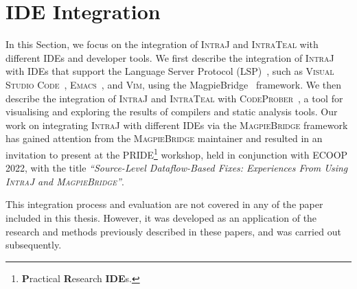 \section{IDE Integration}
\label{sec:IDEIntegration}
In this Section, we focus on the integration of \textsc{IntraJ} and \textsc{IntraTeal} with different
IDEs and developer tools. We first describe the integration of \textsc{IntraJ} with
IDEs that support the Language Server Protocol (LSP)~\cite{lsp}, such as
\textsc{Visual Studio Code}~\cite{vscode}, \textsc{Emacs}~\cite{emacs}, and \textsc{Vim}\cite{vim}, using
the MagpieBridge~\cite{luo_et_al:LIPIcs:2019:10813} framework. We then describe the
integration of \textsc{IntraJ} and \textsc{IntraTeal} with \textsc{CodeProber}~\cite{risberg2022property},
a tool for visualising and exploring the results of compilers and static analysis tools.
Our work on integrating \textsc{IntraJ} with different IDEs via the \textsc{MagpieBridge}
framework has gained attention from the \textsc{MagpieBridge} maintainer and resulted in an invitation
to present at the \textsc{PRIDE}\footnote{\textbf{P}ractical \textbf{R}esearch \textbf{IDE}s.} workshop, held in conjunction with \textsc{ECOOP 2022}, with the
title \emph{``Source-Level Dataflow-Based Fixes: Experiences From Using \textsc{IntraJ} and \textsc{MagpieBridge}''}.

This integration process and evaluation are not covered in any of the paper included in this thesis.
However, it was developed as an application of the research and methods previously
described in these papers, and was carried out subsequently.

